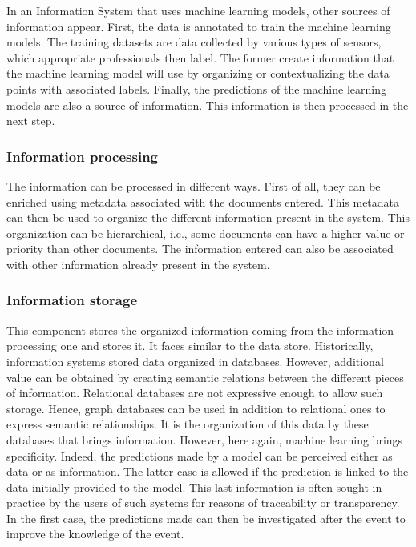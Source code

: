 In an Information System that uses machine learning models, other sources of information appear.
First, the data is annotated to train the machine learning models.
The training datasets are data collected by various types of sensors, which appropriate professionals then label.
The former create information that the machine learning model will use by organizing or contextualizing the data points with associated labels.
Finally, the predictions of the machine learning models are also a source of information.
This information is then processed in the next step.

\subsubsection{Information processing}
The information can be processed in different ways.
First of all, they can be enriched using metadata associated with the documents entered.
This metadata can then be used to organize the different information present in the system.
This organization can be hierarchical, i.e., some documents can have a higher value or priority than other documents.
The information entered can also be associated with other information already present in the system.

\subsubsection{Information storage}
This component stores the organized information coming from the information processing one and stores it.
It faces similar to the data store.
Historically, information systems stored data organized in databases.
However, additional value can be obtained by creating semantic relations between the different pieces of information.
Relational databases are not expressive enough to allow such storage.
Hence, graph databases can be used in addition to relational ones to express semantic relationships.
It is the organization of this data by these databases that brings information.
However, here again, machine learning brings specificity.
Indeed, the predictions made by a model can be perceived either as data or as information.
The latter case is allowed if the prediction is linked to the data initially provided to the model.
This last information is often sought in practice by the users of such systems for reasons of traceability or transparency.
In the first case, the predictions made can then be investigated after the event to improve the knowledge of the event.

